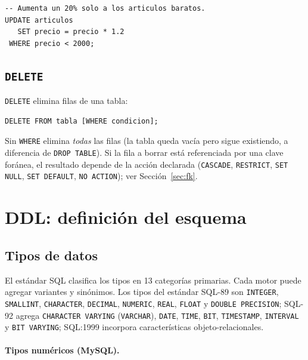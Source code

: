 \documentclass[11pt,a4paper]{article}
\begin{document}
\begin{lstlisting}
-- Aumenta un 20% solo a los articulos baratos.
UPDATE articulos
   SET precio = precio * 1.2
 WHERE precio < 2000;
\end{lstlisting}

\subsection{\texttt{DELETE}}

\texttt{DELETE} elimina filas de una tabla:

\begin{lstlisting}
DELETE FROM tabla [WHERE condicion];
\end{lstlisting}

Sin \texttt{WHERE} elimina \emph{todas} las filas (la tabla queda vacía pero
sigue existiendo, a diferencia de \texttt{DROP TABLE}). Si la fila a borrar
está referenciada por una clave foránea, el resultado depende de la acción
declarada (\texttt{CASCADE}, \texttt{RESTRICT}, \texttt{SET NULL},
\texttt{SET DEFAULT}, \texttt{NO ACTION}); ver Sección~\ref{sec:fk}.

\section{DDL: definición del esquema}

\subsection{Tipos de datos}

El estándar SQL clasifica los tipos en 13 categorías primarias. Cada motor
puede agregar variantes y sinónimos. Los tipos del estándar SQL-89 son
\texttt{INTEGER}, \texttt{SMALLINT}, \texttt{CHARACTER}, \texttt{DECIMAL},
\texttt{NUMERIC}, \texttt{REAL}, \texttt{FLOAT} y \texttt{DOUBLE PRECISION};
SQL-92 agrega \texttt{CHARACTER VARYING} (\texttt{VARCHAR}), \texttt{DATE},
\texttt{TIME}, \texttt{BIT}, \texttt{TIMESTAMP}, \texttt{INTERVAL} y
\texttt{BIT VARYING}; SQL:1999 incorpora características objeto-relacionales.

\paragraph{Tipos numéricos (MySQL).}
\end{document}

